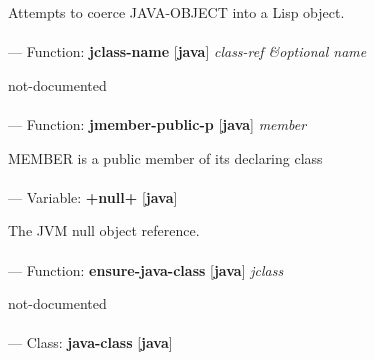 \begin{adjustwidth}{5em}{5em}
Attempts to coerce JAVA-OBJECT into a Lisp object.
\end{adjustwidth}

\paragraph{}
\label{JAVA:JCLASS-NAME}
--- Function: \textbf{jclass-name} [\textbf{java}] \textit{class-ref \&optional name}

\begin{adjustwidth}{5em}{5em}
not-documented
\end{adjustwidth}

\paragraph{}
\label{JAVA:JMEMBER-PUBLIC-P}
--- Function: \textbf{jmember-public-p} [\textbf{java}] \textit{member}

\begin{adjustwidth}{5em}{5em}
MEMBER is a public member of its declaring class
\end{adjustwidth}

\paragraph{}
\label{JAVA:+NULL+}
--- Variable: \textbf{+null+} [\textbf{java}] \textit{}

\begin{adjustwidth}{5em}{5em}
The JVM null object reference.
\end{adjustwidth}

\paragraph{}
\label{JAVA:ENSURE-JAVA-CLASS}
--- Function: \textbf{ensure-java-class} [\textbf{java}] \textit{jclass}

\begin{adjustwidth}{5em}{5em}
not-documented
\end{adjustwidth}

\paragraph{}
\label{JAVA:JAVA-CLASS}
--- Class: \textbf{java-class} [\textbf{java}] \textit{}

